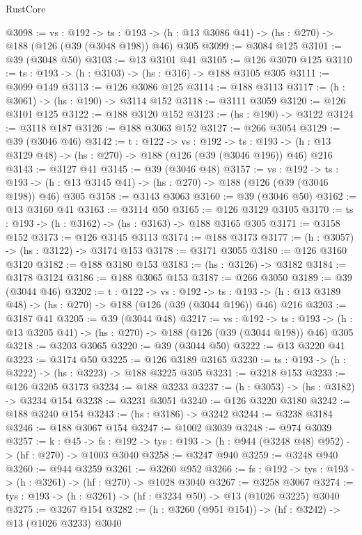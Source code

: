 \begin{lexlean}{RustCore}
\begin{coremodule}
@3098 := {vs : @192} ->
  {ts : @193} -> (h : @13 @3086 @41) -> (hs : @270) -> @188 (@126 (@39 (@3048 @198)) @46) @305
@3099 := @3084 @125
@3101 := @39 (@3048 @50)
@3103 := @13 @3101 @41
@3105 := @126 @3070 @125
@3110 := {ts : @193} -> (h : @3103) -> (hs : @316) -> @188 @3105 @305
@3111 := @3099 @149
@3113 := @126 @3086 @125
@3114 := @188 @3113
@3117 := (h : @3061) -> (hs : @190) -> @3114 @152
@3118 := @3111 @3059
@3120 := @126 @3101 @125
@3122 := @188 @3120 @152
@3123 := (hs : @190) -> @3122
@3124 := @3118 @187
@3126 := @188 @3063 @152
@3127 := @266 @3054
@3129 := @39 (@3046 @46)
@3142 := {t : @122} ->
  {vs : @192} ->
  {ts : @193} -> (h : @13 @3129 @48) -> (hs : @270) -> @188 (@126 (@39 (@3046 @196)) @46) @216
@3143 := @3127 @41
@3145 := @39 (@3046 @48)
@3157 := {vs : @192} ->
  {ts : @193} -> (h : @13 @3145 @41) -> (hs : @270) -> @188 (@126 (@39 (@3046 @198)) @46) @305
@3158 := @3143 @3063
@3160 := @39 (@3046 @50)
@3162 := @13 @3160 @41
@3163 := @3114 @50
@3165 := @126 @3129 @3105
@3170 := {ts : @193} -> (h : @3162) -> (hs : @3163) -> @188 @3165 @305
@3171 := @3158 @152
@3173 := @126 @3145 @3113
@3174 := @188 @3173
@3177 := (h : @3057) -> (hs : @3122) -> @3174 @153
@3178 := @3171 @3055
@3180 := @126 @3160 @3120
@3182 := @188 @3180 @153
@3183 := (hs : @3126) -> @3182
@3184 := @3178 @3124
@3186 := @188 @3065 @153
@3187 := @266 @3050
@3189 := @39 (@3044 @46)
@3202 := {t : @122} ->
  {vs : @192} ->
  {ts : @193} -> (h : @13 @3189 @48) -> (hs : @270) -> @188 (@126 (@39 (@3044 @196)) @46) @216
@3203 := @3187 @41
@3205 := @39 (@3044 @48)
@3217 := {vs : @192} ->
  {ts : @193} -> (h : @13 @3205 @41) -> (hs : @270) -> @188 (@126 (@39 (@3044 @198)) @46) @305
@3218 := @3203 @3065
@3220 := @39 (@3044 @50)
@3222 := @13 @3220 @41
@3223 := @3174 @50
@3225 := @126 @3189 @3165
@3230 := {ts : @193} -> (h : @3222) -> (hs : @3223) -> @188 @3225 @305
@3231 := @3218 @153
@3233 := @126 @3205 @3173
@3234 := @188 @3233
@3237 := (h : @3053) -> (hs : @3182) -> @3234 @154
@3238 := @3231 @3051
@3240 := @126 @3220 @3180
@3242 := @188 @3240 @154
@3243 := (hs : @3186) -> @3242
@3244 := @3238 @3184
@3246 := @188 @3067 @154
@3247 := @1002 @3039
@3248 := @974 @3039
@3257 := {k : @45} ->
  {fs : @192} -> {tys : @193} -> (h : @944 (@3248 @48) @952) -> (hf : @270) -> @1003 @3040
@3258 := @3247 @940
@3259 := @3248 @940
@3260 := @944 @3259
@3261 := @3260 @952
@3266 := {fs : @192} -> {tys : @193} -> (h : @3261) -> (hf : @270) -> @1028 @3040
@3267 := @3258 @3067
@3274 := {tys : @193} -> (h : @3261) -> (hf : @3234 @50) -> @13 (@1026 @3225) @3040
@3275 := @3267 @154
@3282 := (h : @3260 (@951 @154)) -> (hf : @3242) -> @13 (@1026 @3233) @3040

\end{coremodule}
\end{lexlean}
